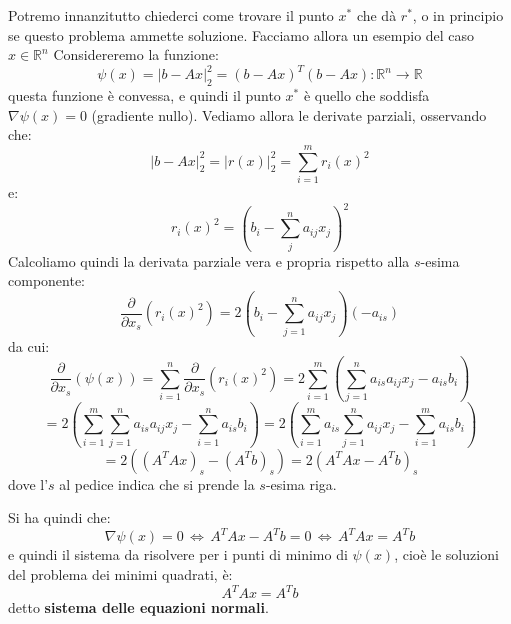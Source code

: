 \documentclass[a4paper,11pt]{article}
\begin{document}
Potremo innanzitutto chiederci come trovare il punto $x^*$ che dà $r^*$, o in principio se questo problema ammette soluzione.
Facciamo allora un esempio del caso $x \in \mathbb{R}^n$
Considereremo la funzione:
$$
\psi(x) = |b - Ax|_2^2 = (b - Ax)^T (b - Ax) : \mathbb{R}^n \rightarrow \mathbb{R}
$$
questa funzione è convessa, e quindi il punto $x^*$ è quello che soddisfa $\nabla \psi(x) = 0$ (gradiente nullo).
Vediamo allora le derivate parziali, osservando che:
$$
|b - Ax|_2^2 = |r(x)|_2^2 = \sum_{i = 1}^m r_i(x)^2
$$
e:
$$
r_i(x)^2 = \left( b_i - \sum_j^n a_{ij} x_j \right)^2
$$
Calcoliamo quindi la derivata parziale vera e propria rispetto alla $s$-esima componente:
$$
\frac{\partial}{\partial x_s} \left( r_i(x)^2 \right) = 2 \left( b_i - \sum_{j = 1}^n a_{ij} x_j \right) (-a_{is}) 
$$
da cui:
$$
\frac{\partial}{\partial x_s} \left( \psi(x) \right) = \sum_{i = 1}^n \frac{\partial}{\partial x_s} \left( r_i(x)^2 \right) = 2 \sum_{i = 1}^m \left( \sum_{j = 1}^n a_{is} a_{ij} x_j - a_{is} b_i \right)
$$
$$
= 2 \left( \sum_{i = 1}^m \sum_{j = 1}^n a_{is} a_{ij} x_j - \sum_{i = 1}^n a_{is} b_i \right) = 2 \left( \sum_{i = 1}^m a_{is} \sum_{j = 1}^{n} a_{ij} x_j - \sum_{i = 1}^m a_{is} b_i \right)
$$
$$
= 2 \left( \left(A^T Ax \right)_s - \left( A^T b \right)_s \right) = 2 \left( A^T A x - A^T b \right)_s
$$
dove l'$s$ al pedice indica che si prende la $s$-esima riga.

Si ha quindi che:
$$
\nabla \psi(x) = 0 \, \Leftrightarrow \, A^T A x - A^T b = 0 \, \Leftrightarrow \, A^T A x = A^T b
$$
e quindi il sistema da risolvere per i punti di minimo di $\psi(x)$, cioè le soluzioni del problema dei minimi quadrati, è:
$$
A^T A x = A^T b
$$
detto \textbf{sistema delle equazioni normali}.
\end{document}
